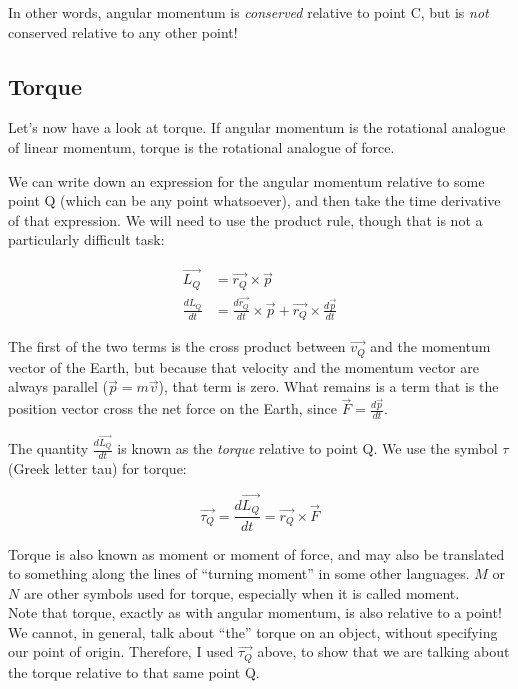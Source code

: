 In other words, angular momentum is \emph{conserved} relative to point C, but is \emph{not} conserved relative to any other point!

\subsection{Torque}

Let's now have a look at torque. If angular momentum is the rotational analogue of linear momentum, torque is the rotational analogue of force.

We can write down an expression for the angular momentum relative to some point Q (which can be any point whatsoever), and then take the time derivative of that expression. We will need to use the product rule, though that is not a particularly difficult task:

\begin{align}
\vec{L_Q} &= \vec{r_Q} \times \vec{p}\\
\frac{dL_Q}{dt} &= \frac{d\vec{r_Q}}{dt} \times \vec{p} + \vec{r_Q} \times \frac{d\vec{p}}{dt}
\end{align}

The first of the two terms is the cross product between $\vec{v_Q}$ and the momentum vector of the Earth, but because that velocity and the momentum vector are always parallel ($\vec{p} = m \vec{v}$), that term is zero. What remains is a term that is the position vector cross the net force on the Earth, since $\displaystyle \vec{F} = \frac{d\vec{p}}{dt}$.

The quantity $\displaystyle \frac{d\vec{L_Q}}{dt}$ is known as the \emph{torque} relative to point Q. We use the symbol $\tau$ (Greek letter tau) for torque:

\begin{equation}
\vec{\tau_Q} = \frac{d\vec{L_Q}}{dt} = \vec{r_Q} \times \vec{F}
\end{equation}

Torque is also known as moment or moment of force, and may also be translated to something along the lines of ``turning moment'' in some other languages. $M$ or $N$ are other symbols used for torque, especially when it is called moment.\\
Note that torque, exactly as with angular momentum, is also relative to a point! We cannot, in general, talk about ``the'' torque on an object, without specifying our point of origin. Therefore, I used $\vec{\tau_Q}$ above, to show that we are talking about the torque relative to that same point Q.

